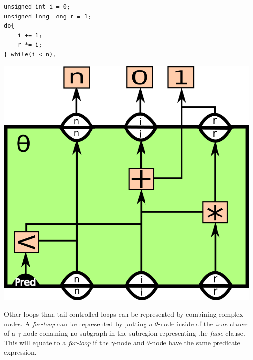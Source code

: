 \begin{itemize}
\begin{centering}
	\noindent\begin{minipage}{0.36\textwidth}
		\begin{CenteredBox}
		\begin{lstlisting}[style=global_customcpp,
label={lst:fig:factorial_loop_ex}, basicstyle=\fontsize{10}{1}]
unsigned int i = 0;
unsigned long long r = 1;
do{
	i += 1;
	r *= i;
} while(i < n);
		\end{lstlisting}
		\end{CenteredBox}
	\end{minipage}
	\noindent\begin{minipage}{0.55\textwidth}
		\captionsetup{type=figure}
		\includegraphics[width=\textwidth]{figures/iterative_factorial_ex}
	\end{minipage}
	\label{fig:factorial_loop_ex}
\end{centering}

Other loops than tail-controlled loops can be represented by combining complex
nodes. A \textit{for-loop} can be represented by putting a $\theta$-node inside
of the \textit{true} clause of a $\gamma$-node conaining no subgraph in the
subregion representing the \textit{false} clause. This will equate to a
\textit{for-loop} if the $\gamma$-node and $\theta$-node have the same predicate
expression.


\end{itemize}
